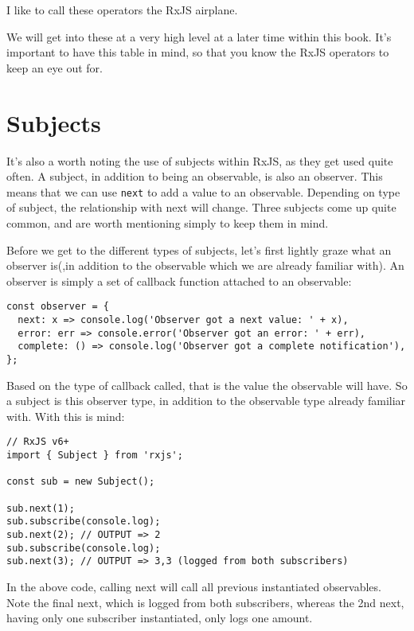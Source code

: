 I like to call these operators the RxJS airplane. 

We will get into these at a very high level at a later time within this book. 
It's important to have this table in mind, so that you know the RxJS operators 
to keep an eye out for. 

\section{Subjects}
It's also a worth noting the use of subjects within RxJS, as they get used
quite often. A subject, in addition to being an observable, is also an observer. 
This means that we can use \lstinline{next} to add a value to an observable. 
Depending on type of subject, the relationship with next will change. Three 
subjects come up quite common, and are worth mentioning simply to keep them in 
mind. 

Before we get to the different types of subjects, let's first lightly graze 
what an observer is(,in addition to the observable which we are already 
familiar with). An observer is simply a set of callback function attached 
to an observable: 
\begin{verbatim}
const observer = {
  next: x => console.log('Observer got a next value: ' + x),
  error: err => console.error('Observer got an error: ' + err),
  complete: () => console.log('Observer got a complete notification'),
};  
\end{verbatim}

Based on the type of callback called, that is the value the observable will 
have. So a subject is this observer type, in addition to the observable type 
already familiar with. With this is mind: 

\begin{lstlisting}[caption=using next on our subject]
// RxJS v6+
import { Subject } from 'rxjs';

const sub = new Subject();

sub.next(1);
sub.subscribe(console.log);
sub.next(2); // OUTPUT => 2
sub.subscribe(console.log);
sub.next(3); // OUTPUT => 3,3 (logged from both subscribers)
\end{lstlisting}

In the above code, calling next will call all previous instantiated observables. 
Note the final next, which is logged from both subscribers, whereas the 2nd next, 
having only one subscriber instantiated, only logs one amount.

